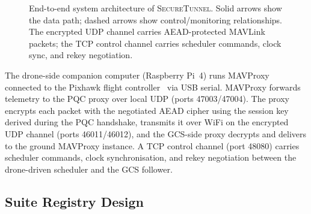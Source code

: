 \documentclass[conference]{IEEEtran}
\newcommand{\sys}{\textsc{SecureTunnel}}
\begin{document}
\begin{figure}[t]
{%
    }%
    \caption{End-to-end system architecture of \sys{}. Solid arrows show the data path; dashed arrows show control/monitoring relationships. The encrypted UDP channel carries AEAD-protected MAVLink packets; the TCP control channel carries scheduler commands, clock sync, and rekey negotiation.}
    \label{fig:arch-overview}
\end{figure}

The drone-side companion computer (Raspberry Pi~4) runs MAVProxy~\cite{mavproxy} connected to the Pixhawk flight controller~\cite{pixhawk} via USB serial.
MAVProxy forwards telemetry to the PQC proxy over local UDP (ports 47003/47004).
The proxy encrypts each packet with the negotiated AEAD cipher using the session key derived during the PQC handshake, transmits it over WiFi on the encrypted UDP channel (ports 46011/46012), and the GCS-side proxy decrypts and delivers to the ground MAVProxy instance.
A TCP control channel (port 48080) carries scheduler commands, clock synchronisation, and rekey negotiation between the drone-driven scheduler and the GCS follower.

\subsection{Suite Registry Design}
\label{sec:suite-registry}
\end{document}
